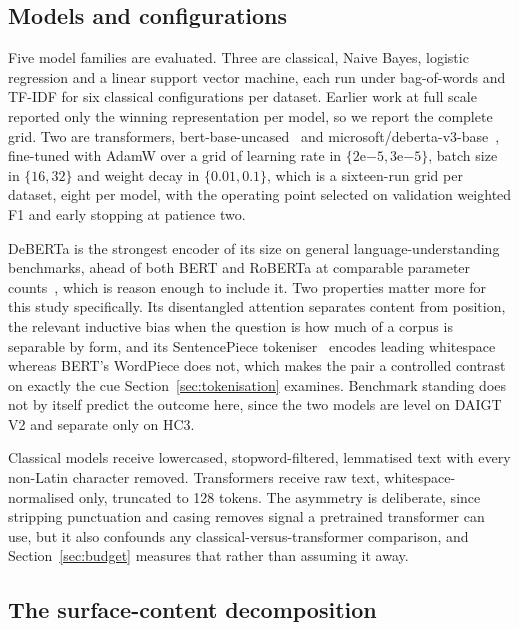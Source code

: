 \subsection{Models and configurations}

Five model families are evaluated. Three are classical, Naive Bayes, logistic regression and a linear support vector machine, each run under bag-of-words and TF-IDF for six classical configurations per dataset. Earlier work at full scale reported only the winning representation per model, so we report the complete grid. Two are transformers, bert-base-uncased~\cite{Devlin2019bert} and microsoft/deberta-v3-base~\cite{He2023debertav3}, fine-tuned with AdamW over a grid of learning rate in $\{2\mathrm{e}{-5}, 3\mathrm{e}{-5}\}$, batch size in $\{16, 32\}$ and weight decay in $\{0.01, 0.1\}$, which is a sixteen-run grid per dataset, eight per model, with the operating point selected on validation weighted F1 and early stopping at patience two.

DeBERTa is the strongest encoder of its size on general language-understanding benchmarks, ahead of both BERT and RoBERTa at comparable parameter counts~\cite{He2023debertav3}, which is reason enough to include it. Two properties matter more for this study specifically. Its disentangled attention separates content from position, the relevant inductive bias when the question is how much of a corpus is separable by form, and its SentencePiece tokeniser~\cite{Kudo2018sentencepiece} encodes leading whitespace whereas BERT's WordPiece does not, which makes the pair a controlled contrast on exactly the cue Section~\ref{sec:tokenisation} examines. Benchmark standing does not by itself predict the outcome here, since the two models are level on DAIGT V2 and separate only on HC3.

Classical models receive lowercased, stopword-filtered, lemmatised text with every non-Latin character removed. Transformers receive raw text, whitespace-normalised only, truncated to 128 tokens. The asymmetry is deliberate, since stripping punctuation and casing removes signal a pretrained transformer can use, but it also confounds any classical-versus-transformer comparison, and Section~\ref{sec:budget} measures that rather than assuming it away.

\subsection{The surface-content decomposition}
\label{sec:decomp-def}


